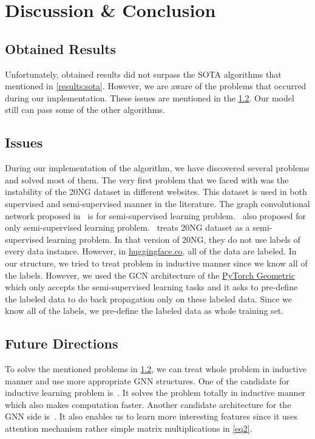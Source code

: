\section{Discussion \& Conclusion}\label{sec:discussion}

\subsection{Obtained Results}
Unfortunately, obtained results did not surpass the SOTA algorithms that mentioned in \cref{results:sota}. However, we are aware of the problems that occurred during our implementation. These issues are mentioned in the \cref{issues}. Our model still can pass some of the other algorithms.

\subsection{Issues}\label{issues}
During our implementation of the algorithm, we have discovered several problems and solved most of them. The very first problem that we faced with was the instability of the 20NG dataset in different websites. This dataset is used in both supervised and semi-supervised manner in the literature. The graph convolutional network proposed in~\autocite{kipf17semisupervised} is for semi-supervised learning problem.~\autocite{yao18graph} also proposed for only semi-supervised learning problem.~\autocite{yao18graph} treats 20NG dataset as a semi-supervised learning problem. In that version of 20NG, they do not use labels of every data instance. However, in  \href{https://huggingface.co/datasets/SetFit/20_newsgroups}{huggingface.co}, all of the data are labeled. In our structure, we tried to treat problem in inductive manner since we know all of the labels. However, we used the GCN architecture of the \href{https://pytorch-geometric.readthedocs.io/en/latest/}{PyTorch Geometric} which only accepts the semi-supervised learning tasks and it asks to pre-define the labeled data to do back propagation only on these labeled data. Since we know all of the labels, we pre-define the labeled data as whole training set.

\subsection{Future Directions}
To solve the mentioned problems in \cref{issues}, we can treat whole problem in inductive manner and use more appropriate GNN structures. One of the candidate for inductive learning problem is~\autocite{fastGCN2018}. It solves the problem totally in inductive manner which also makes computation faster. Another candidate architecture for the GNN side is~\autocite{guo19attention}. It also enables us to learn more interesting features since it uses attention mechanism rather simple matrix multiplications in \cref{eq2}.